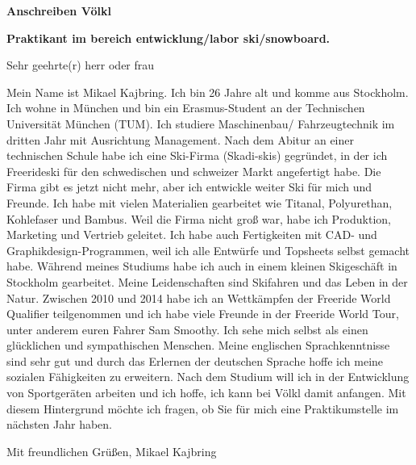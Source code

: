 \documentclass[paper=letter,fontsize=11pt]{scrartcl} %
\newcommand{\sepspace}{\vspace*{1em}}		%
\newcommand{\NewParttwo}[1]{
		\noindent \huge \textbf{#1}
        \normalsize \par}
\newcommand{\Textlong}[4]{
		\noindent \textbf{#1} \par
        \sepspace
        \noindent \small #2
        \par\sepspace      
		\noindent \small #3
        \par\sepspace      
		\noindent \small #4
        \normalsize \par}
\begin{document}
\newpage


\NewParttwo{Anschreiben Völkl}

\sepspace



\Textlong{Praktikant im bereich entwicklung/labor ski/snowboard.}{Sehr geehrte(r) herr oder frau}{Mein Name ist Mikael Kajbring. Ich bin 26 Jahre alt und komme aus Stockholm. Ich wohne in München und bin ein Erasmus-Student an der Technischen Universität München (TUM). Ich studiere Maschinenbau/ Fahrzeugtechnik im dritten Jahr mit Ausrichtung Management. Nach dem Abitur an einer technischen Schule habe ich eine Ski-Firma (Skadi-skis) gegründet, in der ich Freerideski für den schwedischen und schweizer Markt angefertigt habe. Die Firma gibt es jetzt nicht mehr, aber ich entwickle weiter Ski für mich und Freunde. Ich habe mit vielen Materialien gearbeitet wie Titanal, Polyurethan, Kohlefaser und Bambus. Weil die Firma nicht groß war, habe ich Produktion, Marketing und Vertrieb geleitet. Ich habe auch Fertigkeiten mit CAD- und Graphikdesign-Programmen, weil ich alle Entwürfe und Topsheets selbst gemacht habe. Während meines Studiums habe ich auch in einem kleinen Skigeschäft in Stockholm gearbeitet. 
Meine Leidenschaften sind Skifahren und das Leben in der Natur. Zwischen 2010 und 2014 habe ich an Wettkämpfen der Freeride World Qualifier teilgenommen und ich habe viele Freunde in der Freeride World Tour, unter anderem euren Fahrer Sam Smoothy. 
Ich sehe mich selbst als einen glücklichen und sympathischen Menschen. Meine englischen Sprachkenntnisse sind sehr gut und durch das Erlernen der deutschen Sprache hoffe ich meine sozialen Fähigkeiten zu erweitern. Nach dem Studium will ich in der Entwicklung von Sportgeräten arbeiten und ich hoffe, ich kann bei Völkl damit anfangen.
Mit diesem Hintergrund möchte ich fragen, ob Sie für mich eine Praktikumstelle im nächsten Jahr haben.}{Mit freundlichen Grüßen, Mikael Kajbring}

\sepspace
\end{document}
